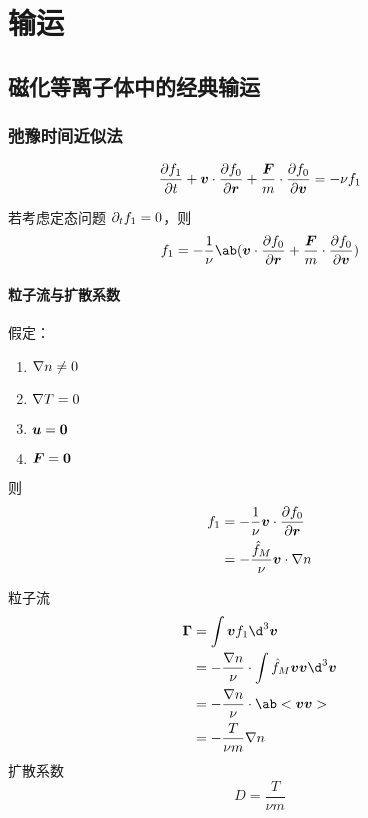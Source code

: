 
\chapter{输运}

\section{磁化等离子体中的经典输运}

\subsection{弛豫时间近似法}

\begin{equation}
\pdv{f_1}{t} + \bm{v} \cdot \pdv{f_0}{\bm{r}}
+ \frac{\bm{F}}{m} \cdot \pdv{f_0}{\bm{v}}
= - \nu f_1
\end{equation}

若考虑定态问题 $\pdv{f_1}!{t}=0$，则
\begin{equation}
f_1 = - \frac{1}{\nu} \ab(\vector{v} \cdot \pdv{f_0}{\vector{r}}
+ \frac{\vector{F}}{m} \cdot \pdv{f_0}{\vector{v}})
\end{equation}

\subsubsection{粒子流与扩散系数}

假定：
\begin{enumerate}
    \item $\nabla {n} \neq 0$
    \item $\nabla {T} = 0$
    \item $\bm{u} = \bm{0}$
    \item $\bm{F} = \bm{0}$
\end{enumerate}
则
\begin{equation}\begin{aligned}
f_1 &= - \frac{1}{\nu} \bm{v} \cdot \pdv{f_0}{\bm{r}} \\
&=- \frac{\hat{f}_M}{\nu} \bm{v} \cdot \nabla {n}
\end{aligned}\end{equation}

粒子流
\begin{equation}\begin{aligned}
\vector{\Gamma} &= \int \vector{v} f_1 \d^3\vector{v} \\
&= - \frac{\grad{n}}{\nu} \cdot \int \hat{f}_M \vector{v}\vector{v} \d^3\vector{v} \\
&= - \frac{\grad{n}}{\nu} \cdot \ab<\vector{v}\vector{v}> \\
&= - \frac{T}{\nu m} \grad{n}
\end{aligned}\end{equation}
扩散系数
\begin{equation}
D = \frac{T}{\nu m}
\end{equation}

